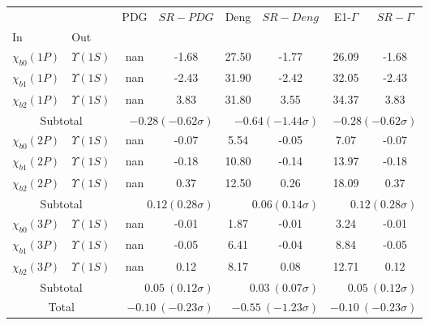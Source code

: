 \begin{tabular}{|l|l|c|c|c|c|c|c|}%
\hline%
&&PDG&$SR-PDG$&Deng&$SR-Deng$&E1-$\Gamma$&$SR-\Gamma$\\%
In&Out&&&&&&\\%
\hline%
$\chi_{b0}(1P)$&$\Upsilon(1S)$&nan&-1.68&27.50&-1.77&26.09&-1.68\\%
$\chi_{b1}(1P)$&$\Upsilon(1S)$&nan&-2.43&31.90&-2.42&32.05&-2.43\\%
$\chi_{b2}(1P)$&$\Upsilon(1S)$&nan&3.83&31.80&3.55&34.37&3.83\\%
\hline%
\hline%
\multicolumn{2}{|c|}{Subtotal}&\multicolumn{2}{|r|}{$-0.28 (-0.62\sigma)$}&\multicolumn{2}{|r|}{$-0.64 (-1.44\sigma)$}&\multicolumn{2}{|r|}{$-0.28 (-0.62\sigma)$}\\%
\hline%
\hline%
$\chi_{b0}(2P)$&$\Upsilon(1S)$&nan&-0.07&5.54&-0.05&7.07&-0.07\\%
$\chi_{b1}(2P)$&$\Upsilon(1S)$&nan&-0.18&10.80&-0.14&13.97&-0.18\\%
$\chi_{b2}(2P)$&$\Upsilon(1S)$&nan&0.37&12.50&0.26&18.09&0.37\\%
\hline%
\hline%
\multicolumn{2}{|c|}{Subtotal}&\multicolumn{2}{|r|}{$0.12 (0.28\sigma)$}&\multicolumn{2}{|r|}{$0.06 (0.14\sigma)$}&\multicolumn{2}{|r|}{$0.12 (0.28\sigma)$}\\%
\hline%
\hline%
$\chi_{b0}(3P)$&$\Upsilon(1S)$&nan&-0.01&1.87&-0.01&3.24&-0.01\\%
$\chi_{b1}(3P)$&$\Upsilon(1S)$&nan&-0.05&6.41&-0.04&8.84&-0.05\\%
$\chi_{b2}(3P)$&$\Upsilon(1S)$&nan&0.12&8.17&0.08&12.71&0.12\\%
\hline%
\hline%
\multicolumn{2}{|c|}{Subtotal}&\multicolumn{2}{|r|}{$0.05~(0.12\sigma)$}&\multicolumn{2}{|r|}{$0.03~(0.07\sigma)$}&\multicolumn{2}{|r|}{$0.05~(0.12\sigma)$}\\%
\hline%
\hline%
\multicolumn{2}{|c|}{Total}&\multicolumn{2}{|r|}{$-0.10~(-0.23\sigma)$}&\multicolumn{2}{|r|}{$-0.55~(-1.23\sigma)$}&\multicolumn{2}{|r|}{$-0.10~(-0.23\sigma)$}\\%
\hline%
\end{tabular}